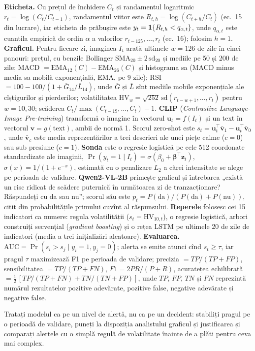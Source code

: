 {\textbf{Eticheta.} Cu prețul de închidere $C_t$ și randamentul logaritmic $r_t=\log(C_t/C_{t-1})$, randamentul viitor este $R_{t,h}=\log(C_{t+h}/C_t)$ (ec.~15 din lucrare), iar eticheta de prăbușire este $y_t=\mathbf{1}\{R_{t,h}<q_{\alpha,t}\}$, unde $q_{\alpha,t}$ este cuantila empirică de ordin $\alpha$ a valorilor $r_{t-125},\dots,r_t$ (ec.~16); folosim $h=1$.
\textbf{Graficul.} Pentru fiecare zi, imaginea $I_t$ arată ultimele $w=126$ de zile în cinci panouri: prețul, cu benzile Bollinger $\mathrm{SMA}_{20}\pm2\,\mathrm{sd}_{20}$ și mediile pe 50 și 200 de zile; MACD $=\mathrm{EMA}_{12}(C)-\mathrm{EMA}_{26}(C)$ și histograma sa (MACD minus media sa mobilă exponențială, EMA, pe 9 zile); RSI $=100-100/(1+\overline{G}_{14}/\overline{L}_{14})$, unde $\overline{G}$ și $\overline{L}$ sînt mediile mobile exponențiale ale cîștigurilor și pierderilor; volatilitatea $\mathrm{HV}_w=\sqrt{252}\,\mathrm{sd}(r_{t-w+1},\dots,r_t)$ pentru $w=10,30$; scăderea $C_t/\max(C_{t-19},\dots,C_t)-1$.
\textbf{CLIP} (\emph{Contrastive Language-Image Pre-training}) transformă o imagine în vectorul $\mathbf u_t=f(I_t)$ și un text în vectorul $\mathbf v=g(\text{text})$, ambii de normă 1.
Scorul zero-shot este $s_t=\mathbf u_t^\top\bar{\mathbf v}_1-\mathbf u_t^\top\bar{\mathbf v}_0$, unde $\bar{\mathbf v}_c$ este media reprezentărilor a trei descrieri ale unei piețe calme ($c=0$) sau sub presiune ($c=1$).
\textbf{Sonda} este o regresie logistică pe cele 512 coordonate standardizate ale imaginii, $\Pr(y_t=1\mid I_t)=\sigma(\beta_0+\boldsymbol\beta^\top\mathbf z_t)$, $\sigma(x)=1/(1+e^{-x})$, estimată cu o penalizare $L_2$ a cărei intensitate se alege pe perioada de validare.
\textbf{Qwen2-VL-2B} primește graficul și întrebarea „există un risc ridicat de scădere puternică în următoarea zi de tranzacționare? Răspundeți cu da sau nu”; scorul său este $p_t=P(\text{da})/(P(\text{da})+P(\text{nu}))$, citit din probabilitățile primului cuvînt al răspunsului.
\textbf{Reperele} folosesc cei 15 indicatori ca numere: regula volatilității ($s_t=\mathrm{HV}_{10,t}$), o regresie logistică, arbori construiți secvențial (\emph{gradient boosting}) și o rețea LSTM pe ultimele 20 de zile de indicatori (media a trei inițializări aleatoare).
\textbf{Evaluarea.} $\mathrm{AUC}=\Pr(s_i>s_j\mid y_i=1,y_j=0)$; alerta se emite atunci cînd $s_t\ge\tau$, iar pragul $\tau$ maximizează F1 pe perioada de validare; precizia $=TP/(TP+FP)$, sensibilitatea $=TP/(TP+FN)$, $F1=2PR/(P+R)$, acuratețea echilibrată $=\tfrac12\,[TP/(TP+FN)+TN/(TN+FP)]$, unde $TP$, $FP$, $TN$ și $FN$ reprezintă numărul rezultatelor pozitive adevărate, pozitive false, negative adevărate și negative false.}
\begin{decision}
%
{Tratați modelul ca pe un nivel de alertă, nu ca pe un decident: stabiliți pragul pe o perioadă de validare, puneți la dispoziția analistului graficul și justificarea și comparați alertele cu o simplă regulă de volatilitate înainte de a plăti pentru ceva mai complex.}
\end{decision}

